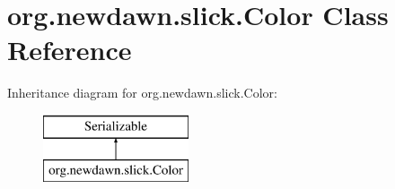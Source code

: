 \hypertarget{classorg_1_1newdawn_1_1slick_1_1_color}{}\section{org.\+newdawn.\+slick.\+Color Class Reference}
\label{classorg_1_1newdawn_1_1slick_1_1_color}
Inheritance diagram for org.\+newdawn.\+slick.\+Color\+:\begin{figure}[H]
\begin{center}
\leavevmode
\includegraphics[height=2.000000cm]{classorg_1_1newdawn_1_1slick_1_1_color}
\end{center}
\end{figure}

